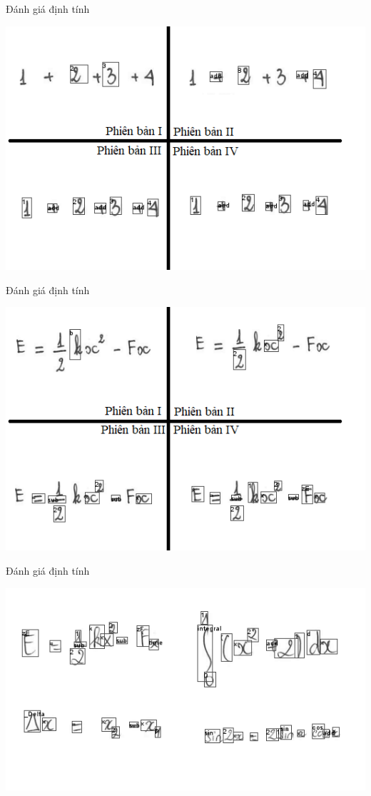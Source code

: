 \documentclass{beamer}
\begin{document}
	\begin{frame}{Đánh giá định tính}
		\begin{center}
			\centering
			\includegraphics[width=0.775\linewidth]{compare_4.png}
			\vspace{0.5cm}
		\end{center}
	\end{frame}
	\begin{frame}{Đánh giá định tính}
		\begin{center}
			\centering
			\includegraphics[width=0.775\linewidth]{compare_1.png}
			\vspace{0.5cm}
		\end{center}
	\end{frame}
	\begin{frame}{Đánh giá định tính}
		\begin{center}
			\centering
			\includegraphics[width=0.85\linewidth]{compare_7.png}
			\vspace{0.5cm}
		\end{center}
	\end{frame}
	
\end{document}

